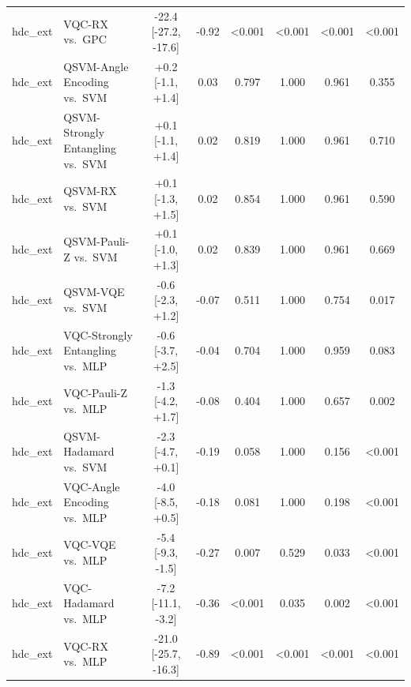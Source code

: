 \begin{tabular}{llcccccc}
hdc_ext & VQC-RX vs.\ GPC & -22.4 [-27.2, -17.6] & -0.92 & <0.001 & <0.001 & <0.001 & <0.001 \\
hdc_ext & QSVM-Angle Encoding vs.\ SVM & +0.2 [-1.1, +1.4] & 0.03 & 0.797 & 1.000 & 0.961 & 0.355 \\
hdc_ext & QSVM-Strongly Entangling vs.\ SVM & +0.1 [-1.1, +1.4] & 0.02 & 0.819 & 1.000 & 0.961 & 0.710 \\
hdc_ext & QSVM-RX vs.\ SVM & +0.1 [-1.3, +1.5] & 0.02 & 0.854 & 1.000 & 0.961 & 0.590 \\
hdc_ext & QSVM-Pauli-Z vs.\ SVM & +0.1 [-1.0, +1.3] & 0.02 & 0.839 & 1.000 & 0.961 & 0.669 \\
hdc_ext & QSVM-VQE vs.\ SVM & -0.6 [-2.3, +1.2] & -0.07 & 0.511 & 1.000 & 0.754 & 0.017 \\
hdc_ext & VQC-Strongly Entangling vs.\ MLP & -0.6 [-3.7, +2.5] & -0.04 & 0.704 & 1.000 & 0.959 & 0.083 \\
hdc_ext & VQC-Pauli-Z vs.\ MLP & -1.3 [-4.2, +1.7] & -0.08 & 0.404 & 1.000 & 0.657 & 0.002 \\
hdc_ext & QSVM-Hadamard vs.\ SVM & -2.3 [-4.7, +0.1] & -0.19 & 0.058 & 1.000 & 0.156 & <0.001 \\
hdc_ext & VQC-Angle Encoding vs.\ MLP & -4.0 [-8.5, +0.5] & -0.18 & 0.081 & 1.000 & 0.198 & <0.001 \\
hdc_ext & VQC-VQE vs.\ MLP & -5.4 [-9.3, -1.5] & -0.27 & 0.007 & 0.529 & 0.033 & <0.001 \\
hdc_ext & VQC-Hadamard vs.\ MLP & -7.2 [-11.1, -3.2] & -0.36 & <0.001 & 0.035 & 0.002 & <0.001 \\
hdc_ext & VQC-RX vs.\ MLP & -21.0 [-25.7, -16.3] & -0.89 & <0.001 & <0.001 & <0.001 & <0.001 \\
\bottomrule
\end{tabular}